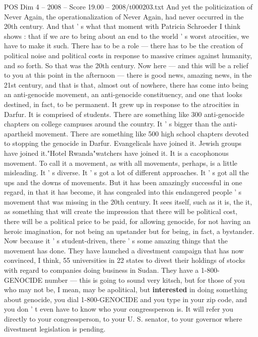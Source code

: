 \begin{textsample}{POS Dim 4 – 2008 – Score 19.00 – 2008/t000203.txt}
And yet the politicization of Never Again, the operationalization of Never Again, had never occurred in the 20th century.
And that ' s what that moment with Patricia Schroeder I think shows : that if we are to bring about an end to the world ' s worst atrocities, we have to make it such.
There has to be a role — there has to be the creation of political noise and political costs in response to massive crimes against humanity, and so forth.
So that was the 20th century.
Now here — and this will be a relief to you at this point in the afternoon — there is good news, amazing news, in the 21st century, and that is that, almost out of nowhere, there has come into being an anti-genocide movement, an anti-genocide constituency, and one that looks destined, in fact, to be permanent.
It grew up in response to the atrocities in Darfur.
It is comprised of students.
There are something like 300 anti-genocide chapters on college campuses around the country.
It ' s bigger than the anti-apartheid movement.
There are something like 500 high school chapters devoted to stopping the genocide in Darfur.
Evangelicals have joined it.
Jewish groups have joined it."Hotel Rwanda"watchers have joined it.
It is a cacophonous movement.
To call it a movement, as with all movements, perhaps, is a little misleading.
It ' s diverse.
It ' s got a lot of different approaches.
It ' s got all the ups and the downs of movements.
But it has been amazingly successful in one regard, in that it has become, it has congealed into this endangered people ' s movement that was missing in the 20th century.
It sees itself, such as it is, the it, as something that will create the impression that there will be political cost, there will be a political price to be paid, for allowing genocide, for not having an heroic imagination, for not being an upstander but for being, in fact, a bystander.
Now because it ' s student-driven, there ' s some amazing things that the movement has done.
They have launched a divestment campaign that has now convinced, I think, 55 universities in 22 states to divest their holdings of stocks with regard to companies doing business in Sudan.
They have a 1-800-GENOCIDE number — this is going to sound very kitsch, but for those of you who may not be, I mean, may be apolitical, but \textbf{interested} in doing something about genocide, you dial 1-800-GENOCIDE and you type in your zip code, and you don ' t even have to know who your congressperson is.
It will refer you directly to your congressperson, to your U.
S. senator, to your governor where divestment legislation is pending.

\end{textsample}
